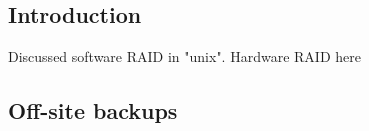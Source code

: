 
\subsection{Introduction}

Discussed software RAID in "unix". Hardware RAID here

\subsection{Off-site backups}


